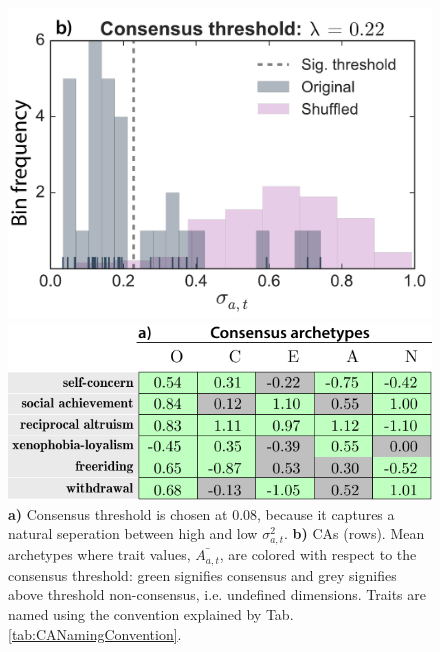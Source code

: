 \begin{figure}[h]
	\centering
	\begin{minipage}[l]{0.42\textwidth}
		\centering
		\includegraphics[width=\textwidth]{figures/varianceThreshold}
	\end{minipage}
	\begin{minipage}[r]{0.52\textwidth}
		\centering
		\vspace{-0.67cm}
		\includegraphics[width=\textwidth]{figures/consensusArchetypes}
	\end{minipage}
	\vspace{-0.25cm}
	\caption{\label{fig:varianceThreshold} \textbf{a)} Consensus threshold is chosen at 0.08, because it captures a natural seperation between high and low $\sigma_{a,t}^2$. \textbf{b)} CAs (rows). Mean archetypes where trait values, $\bar{A_{a,t}}$, are colored with respect to the consensus threshold: green signifies consensus and grey signifies above threshold non-consensus, i.e. undefined dimensions. Traits are named using the convention explained by Tab. \ref{tab:CANamingConvention}.}
\end{figure}


